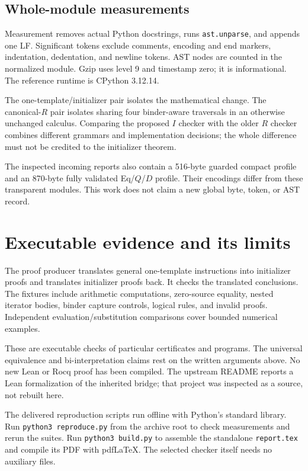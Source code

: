 \documentclass[11pt,a4paper]{article}
\theoremstyle{definition}
\begin{document}
\subsection{Whole-module measurements}



Measurement removes actual Python docstrings, runs \texttt{ast.unparse},
and appends one LF. Significant tokens exclude comments, encoding and
end markers, indentation, dedentation, and newline tokens. AST nodes
are counted in the normalized module. Gzip uses level 9 and timestamp
zero; it is informational. The reference runtime is CPython 3.12.14.

The one-template/initializer pair isolates the mathematical change.
The canonical-\(R\) pair isolates sharing four binder-aware traversals
in an otherwise unchanged calculus. Comparing the proposed \(I\)
checker with the older \(R\) checker combines different grammars and
implementation decisions; the whole difference must not be credited
to the initializer theorem.

The inspected incoming reports also contain a 516-byte guarded compact
profile and an 870-byte fully validated Eq/\(Q\)/\(D\) profile. Their
encodings differ from these transparent modules. This work does not
claim a new global byte, token, or AST record.

\section{Executable evidence and its limits}
\label{sec:verification}



The proof producer translates general one-template instructions into
initializer proofs and translates initializer proofs back. It checks
the translated conclusions. The fixtures include arithmetic
computations, zero-source equality, nested iterator bodies, binder
capture controls, logical rules, and invalid proofs. Independent
evaluation/substitution comparisons cover bounded numerical examples.

These are executable checks of particular certificates and programs.
The universal equivalence and bi-interpretation claims rest on the
written arguments above. No new Lean or Rocq proof has been compiled.
The upstream README reports a Lean formalization of the inherited
bridge; that project was inspected as a source, not rebuilt here.

The delivered reproduction scripts run offline with Python's standard
library. Run \texttt{python3 reproduce.py} from the archive root to
check measurements and rerun the suites. Run \texttt{python3 build.py}
to assemble the standalone \texttt{report.tex} and compile its PDF
with pdfLaTeX. The selected checker itself needs no auxiliary files.
\end{document}
